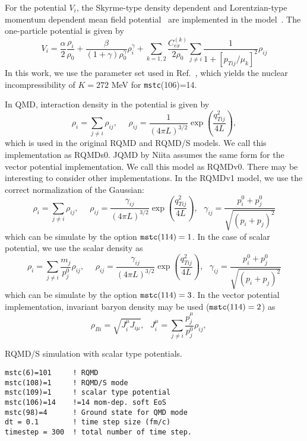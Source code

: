 \documentclass[]{article}
\newcommand{\ttt}[1]{{\tt#1}}
\begin{document}
For the potential $V_i$,
the Skyrme-type density dependent and Lorentzian-type momentum dependent
mean field potential~\cite{CGalePRC1987}
are implemented in the model~\cite{MIssePRC2005,YNaraNPA2016}.
The one-particle potential is given by
\begin{equation}
V_i = \frac{\alpha}{2}\frac{\rho_{i}}{\rho_0}
       +\frac{\beta}{(1+\gamma)\rho_0^\gamma}\rho_{i}^\gamma
 + \sum_{k=1,2}\frac{C_{ex}^{(k)}}{2\rho_0}
    \sum_{j\neq i}\frac{1}{1+[p_{Tij}/\mu_k]^2}\rho_{ij}
\label{eq:pot}
\end{equation}
In this work, we use the parameter set used in Ref.~\cite{YNaraNPA2016},
which yields the nuclear incompressibility of $K=272$ MeV
for \ttt{mstc}(106)=14.

In QMD, interaction density in the potential is given by
\begin{equation}
\rho_{i}=\sum_{j\neq i}\rho_{ij},~~~~~~
  \rho_{ij}=\frac{1}{(4\pi L)^{3/2}}\exp\left(
    \frac{q^2_{Tij}}{4L}\right),
\end{equation}
which is used in the original RQMD and RQMD/S models.
We call this implementation as RQMDs0.
JQMD by Niita assumes the same form for the vector potential implementation.
We call this model as RQMDv0.
There may be interesting to consider other implementations.
In the RQMDv1 model, we use the correct normalization of the Gaussian:
\begin{equation}
\rho_{i}=\sum_{j\neq i}\rho_{ij},~~~~~~
  \rho_{ij}=\frac{\gamma_{ij}}{(4\pi L)^{3/2}}\exp\left(
    \frac{q^2_{Tij}}{4L}\right),~~~
    \gamma_{ij}=\frac{p_i^0 + p_j^0}{\sqrt{(p_i+p_j)^2}}
\end{equation}
which can be simulate by the option $\ttt{mstc}(114)=1$.
In the case of scalar potential,  we use the scalar density as
\begin{equation}
\rho_{i}=\sum_{j\neq i}\frac{m_j}{p_j^0}\rho_{ij},~~~~~~
  \rho_{ij}=\frac{\gamma_{ij}}{(4\pi L)^{3/2}}\exp\left(
    \frac{q^2_{Tij}}{4L}\right),~~~
    \gamma_{ij}=\frac{p_i^0 + p_j^0}{\sqrt{(p_i+p_j)^2}}
\end{equation}
which can be simulate by the option $\ttt{mstc}(114)=3$.
In the vector potential implementation, 
invariant baryon density may be used ($\ttt{mstc}(114)=2$) as
\begin{equation}
\rho_{Bi}=\sqrt{J^\mu_i J_{i\mu}},~~~
 J^\mu_i = \sum_{j\neq i}\frac{p^\mu_j}{p_j^0}\rho_{ij},~~~~~~
\end{equation}


\bigskip
RQMD/S simulation with scalar type potentials.
\begin{verbatim}
mstc(6)=101     ! RQMD
mstc(108)=1     ! RQMD/S mode
mstc(109)=1     ! scalar type potential
mstc(106)=14    !=14 mom-dep. soft EoS
mstc(98)=4      ! Ground state for QMD mode
dt = 0.1        ! time step size (fm/c)
timestep = 300  ! total number of time step.
\end{verbatim}
\end{document}

